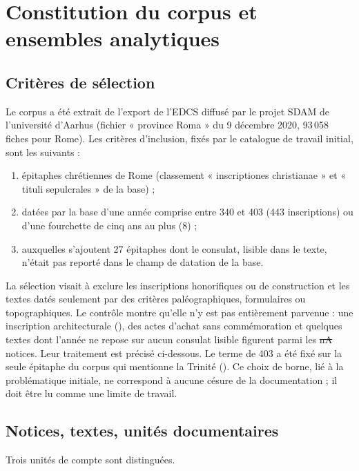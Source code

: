 \chapter{Constitution du corpus et ensembles analytiques}\label{ch:corpus}

\section{Critères de sélection}

Le corpus a été extrait de l’export de l’EDCS diffusé par le projet SDAM de l’université d’Aarhus (fichier « province Roma » du 9 décembre 2020, 93\,058 fiches pour Rome). Les critères d’inclusion, fixés par le catalogue de travail initial, sont les suivants :
\begin{enumerate}[label=(\alph*),leftmargin=2em]
\item épitaphes chrétiennes de Rome (classement « inscriptiones christianae » et « tituli sepulcrales » de la base) ;
\item datées par la base d’une année comprise entre 340 et 403 (443 inscriptions) ou d’une fourchette de cinq ans au plus (8) ;
\item auxquelles s’ajoutent 27 épitaphes dont le consulat, lisible dans le texte, n’était pas reporté dans le champ de datation de la base.
\end{enumerate}

La sélection visait à exclure les inscriptions honorifiques ou de construction et les textes datés seulement par des critères paléographiques, formulaires ou topographiques. Le contrôle montre qu’elle n’y est pas entièrement parvenue : une inscription architecturale (), des actes d’achat sans commémoration et quelques textes dont l’année ne repose sur aucun consulat lisible figurent parmi les \st{nA} notices. Leur traitement est précisé ci-dessous. Le terme de 403 a été fixé sur la seule épitaphe du corpus qui mentionne la Trinité (). Ce choix de borne, lié à la problématique initiale, ne correspond à aucune césure de la documentation ; il doit être lu comme une limite de travail.

\section{Notices, textes, unités documentaires}

Trois unités de compte sont distinguées.

